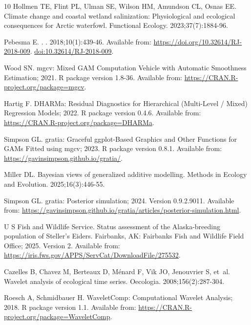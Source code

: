 \documentclass[
  10pt,
  letterpaper,
]{article}
\begin{document}
\begin{thebibliography}{10}
Hollmen TE, Flint PL, Ulman SE, Wilson HM, Amundson CL, Osnas EE.
\newblock Climate change and coastal wetland salinization: Physiological and ecological consequences for Arctic waterfowl.
\newblock Functional Ecology. 2023;37(7):1884-96.

Pebesma E.
.
. 2018;10(1):439-46.
\newblock Available from: \url{https://doi.org/10.32614/RJ-2018-009}. \href {http://dx.doi.org/10.32614/RJ-2018-009} {doi:10.32614/RJ-2018-009}.

Wood SN. mgcv: Mixed GAM Computation Vehicle with Automatic Smoothness Estimation; 2021.
\newblock R package version 1.8-36.
\newblock Available from: \url{https://CRAN.R-project.org/package=mgcv}.

Hartig F. DHARMa: Residual Diagnostics for Hierarchical (Multi-Level / Mixed) Regression Models; 2022.
\newblock R package version 0.4.6.
\newblock Available from: \url{https://CRAN.R-project.org/package=DHARMa}.

Simpson GL. {gratia}: Graceful {ggplot}-Based Graphics and Other Functions for {GAM}s Fitted using {mgcv}; 2023.
\newblock R package version 0.8.1.
\newblock Available from: \url{https://gavinsimpson.github.io/gratia/}.

Miller DL.
\newblock Bayesian views of generalized additive modelling.
\newblock Methods in Ecology and Evolution. 2025;16(3):446-55.

Simpson GL. {gratia}: Posterior simulation; 2024.
\newblock Version 0.9.2.9011.
\newblock Available from: \url{https://gavinsimpson.github.io/gratia/articles/posterior-simulation.html}.

{U S  Fish and Wildlife Service}.
\newblock Status assessment of the {Alaska-breeding} population of {Steller’s Eiders}.
\newblock Fairbanks, {AK}: Fairbanks Fish and Wildlife Field Office; 2025. Version 2.
\newblock Available from: \url{https://iris.fws.gov/APPS/ServCat/DownloadFile/275532}.

Cazelles B, Chavez M, Berteaux D, M{\'e}nard F, Vik JO, Jenouvrier S, et~al.
\newblock Wavelet analysis of ecological time series.
\newblock Oecologia. 2008;156(2):287-304.

Roesch A, Schmidbauer H. {WaveletComp}: Computational Wavelet Analysis; 2018.
\newblock R package version 1.1.
\newblock Available from: \url{https://CRAN.R-project.org/package=WaveletComp}.


\end{thebibliography}
\end{document}
